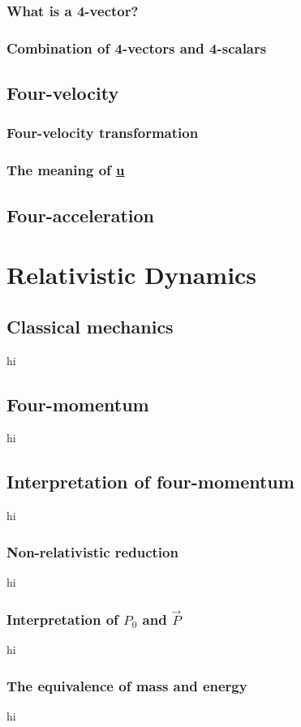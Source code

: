 \documentclass[a4paper,11pt]{article}
\numberwithin{equation}{section}
\begin{document}
 \subsubsection{What is a 4-vector?}
 \subsubsection{Combination of 4-vectors and 4-scalars}
 
 \subsection{Four-velocity}
 \subsubsection{Four-velocity transformation}
 \subsubsection{The meaning of \underline{u}}
 
 \subsection{Four-acceleration}
 
 \section{Relativistic Dynamics}
 \subsection{Classical mechanics}
 hi
 \subsection{Four-momentum}
 hi
 \subsection{Interpretation of four-momentum}
  hi
  \subsubsection{Non-relativistic reduction}
  hi
  \subsubsection{Interpretation of $P_{0}$ and $\vec{P}$}
  hi
  \subsubsection{The equivalence of mass and energy}
  hi
\end{document}
